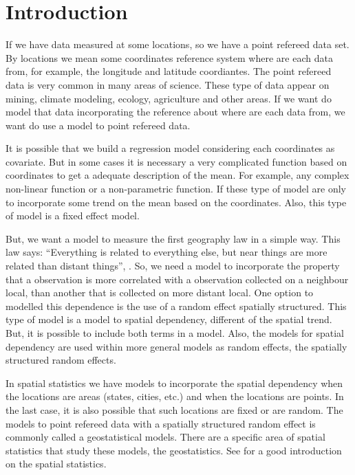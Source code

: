 
\chapter{Introduction} 

If we have data measured at some locations, 
so we have a point refereed data set. 
By locations we mean some coordinates reference 
system where are each data from, for example, 
the longitude and latitude coordiantes.
The point refereed data is very common in many 
areas of science. These type of data appear on 
mining, climate modeling, ecology, agriculture 
and other areas. 
If we want do model that data incorporating 
the reference about where are each data from, 
we want do use a model to point refereed data. 

It is possible that we build a regression model 
considering each coordinates as covariate. 
But in some cases it is necessary a very 
complicated function based on coordinates to 
get a adequate description of the mean. 
For example, any complex non-linear function or 
a non-parametric function. 
If these type of model are only to incorporate 
some trend on the mean based on the coordinates. 
Also, this type of model is a fixed effect model. 

But, we want a model to measure the first geography 
law in a simple way. 
This law says: ``Everything is related to everything else, 
but near things are more related than distant things'', 
\cite{tobler:1970}. 
So, we need a model to incorporate the property that a 
observation is more correlated with a observation 
collected on a neighbour local, than another that 
is collected on more distant local. 
One option to modelled this dependence is the use 
of a random effect spatially structured. 
This type of model is a model to spatial dependency, 
different of the spatial trend. 
But, it is possible to include both terms in a model. 
Also, the models for spatial dependency are used 
within more general models as random effects, 
the spatially structured random effects. 

In spatial statistics we have models to incorporate the 
spatial dependency when the locations are areas 
(states, cities, etc.) and when the locations are points. 
In the last case, it is also possible that such 
locations are fixed or are random. 
The models to point refereed data with a spatially 
structured random effect is commonly called a 
geostatistical models. 
There are a specific area of spatial statistics 
that study these models, the geostatistics. 
See \cite{cressie:1993} for a good introduction on 
the spatial statistics. 

